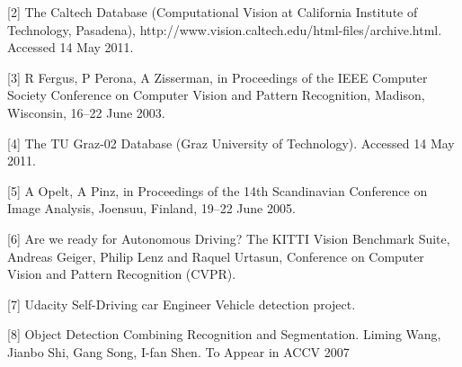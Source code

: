 \documentclass[10pt,journal,compsoc]{IEEEtran}
\begin{document}


[2] The Caltech Database (Computational Vision at California Institute of Technology, Pasadena), http://www.vision.caltech.edu/html-files/archive.html. Accessed 14 May 2011.

[3] R Fergus, P Perona, A Zisserman, in Proceedings of the IEEE Computer Society Conference on Computer Vision and Pattern Recognition, Madison, Wisconsin, 16–22 June 2003.

[4] The TU Graz-02 Database (Graz University of Technology). Accessed 14 May 2011. 

[5] A Opelt, A Pinz, in Proceedings of the 14th Scandinavian Conference on Image Analysis, Joensuu, Finland, 19–22 June 2005.

[6] Are we ready for Autonomous Driving? The KITTI Vision Benchmark Suite, Andreas Geiger, Philip Lenz and Raquel Urtasun, Conference on Computer Vision and Pattern	Recognition (CVPR).

[7] Udacity Self-Driving car Engineer Vehicle detection project.

[8] Object Detection Combining Recognition and Segmentation. Liming Wang, Jianbo Shi, Gang Song, I-fan Shen. To Appear in ACCV 2007
\end{document}
